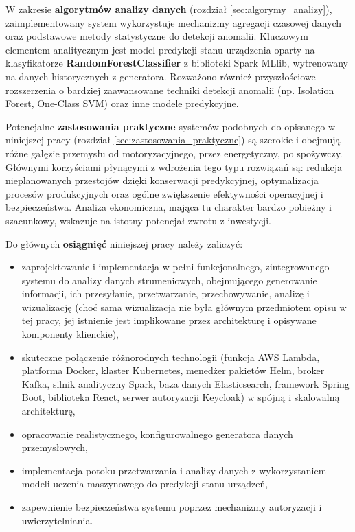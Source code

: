 W zakresie \textbf{algorytmów analizy danych} (rozdział \ref{sec:algorymy_analizy}), zaimplementowany system wykorzystuje mechanizmy agregacji czasowej danych oraz podstawowe metody statystyczne do detekcji anomalii. Kluczowym elementem analitycznym jest model predykcji stanu urządzenia oparty na klasyfikatorze \textbf{RandomForestClassifier} z biblioteki Spark MLlib, wytrenowany na danych historycznych z generatora. Rozważono również przyszłościowe rozszerzenia o bardziej zaawansowane techniki detekcji anomalii (np. Isolation Forest, One-Class SVM) oraz inne modele predykcyjne.

Potencjalne \textbf{zastosowania praktyczne} systemów podobnych do opisanego w niniejszej pracy (rozdział \ref{sec:zastosowania_praktyczne}) są szerokie i obejmują różne gałęzie przemysłu od motoryzacyjnego, przez energetyczny, po spożywczy. Głównymi korzyściami płynącymi z wdrożenia tego typu rozwiązań są: redukcja nieplanowanych przestojów dzięki konserwacji predykcyjnej, optymalizacja procesów produkcyjnych oraz ogólne zwiększenie efektywności operacyjnej i bezpieczeństwa. Analiza ekonomiczna, mająca tu charakter bardzo pobieżny i szacunkowy, wskazuje na istotny potencjał zwrotu z inwestycji.

\vspace{0.3em}

Do głównych \textbf{osiągnięć} niniejszej pracy należy zaliczyć:
\begin{itemize}
    \item zaprojektowanie i implementacja w pełni funkcjonalnego, zintegrowanego systemu do analizy danych  strumeniowych, obejmującego generowanie informacji, ich przesyłanie, przetwarzanie, przechowywanie, analizę i wizualizację (choć sama wizualizacja nie była głównym przedmiotem opisu w tej pracy, jej istnienie jest implikowane przez architekturę i opisywane komponenty klienckie),
    \item skuteczne połączenie różnorodnych technologii (funkcja AWS Lambda, platforma Docker, klaster Kubernetes, menedżer pakietów Helm, broker Kafka, silnik analityczny Spark, baza danych Elasticsearch, framework Spring Boot, biblioteka React, serwer autoryzacji Keycloak) w spójną i skalowalną architekturę,
    \item opracowanie realistycznego, konfigurowalnego generatora danych przemysłowych,
    \item implementacja potoku przetwarzania i analizy danych z wykorzystaniem modeli uczenia maszynowego do predykcji stanu urządzeń,
    \item zapewnienie bezpieczeństwa systemu poprzez mechanizmy autoryzacji i uwierzytelniania.
\end{itemize}

